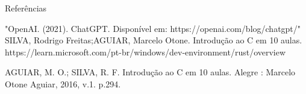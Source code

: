 \documentclass[12pt,a4paper,oneside]{abntex2}
\begin{document}

Referências


"OpenAI. (2021). ChatGPT. Disponível em: https://openai.com/blog/chatgpt/"
SILVA, Rodrigo Freitas;AGUIAR, Marcelo Otone. Introdução ao C em 10 aulas.
https://learn.microsoft.com/pt-br/windows/dev-environment/rust/overview





AGUIAR, M. O.; SILVA, R. F. Introdução ao C em 10 aulas. Alegre : Marcelo Otone Aguiar, 2016, v.1. p.294.
\end{document}
